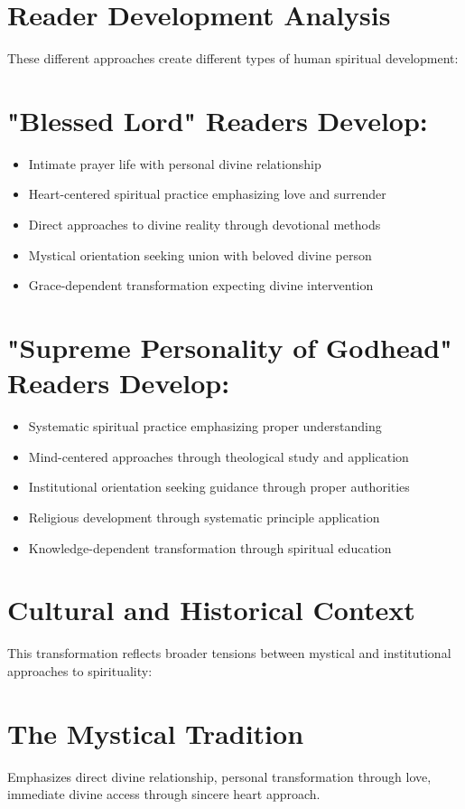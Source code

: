 \documentclass[11pt,twoside]{book}
\begin{document}
\section*{Reader Development Analysis}
\label{sec:orgb93ba68}

These different approaches create different types of human spiritual development:
\section*{"Blessed Lord" Readers Develop:}
\label{sec:org3e9b8cc}
\begin{itemize}
\item Intimate prayer life with personal divine relationship
\item Heart-centered spiritual practice emphasizing love and surrender
\item Direct approaches to divine reality through devotional methods
\item Mystical orientation seeking union with beloved divine person
\item Grace-dependent transformation expecting divine intervention
\end{itemize}
\section*{"Supreme Personality of Godhead" Readers Develop:}
\label{sec:orgc04162a}
\begin{itemize}
\item Systematic spiritual practice emphasizing proper understanding
\item Mind-centered approaches through theological study and application
\item Institutional orientation seeking guidance through proper authorities
\item Religious development through systematic principle application
\item Knowledge-dependent transformation through spiritual education
\end{itemize}
\section*{Cultural and Historical Context}
\label{sec:orga37fd8c}

This transformation reflects broader tensions between mystical and institutional approaches to spirituality:
\section*{The Mystical Tradition}
\label{sec:org9f82cdc}
Emphasizes direct divine relationship, personal transformation through love, immediate divine access through sincere heart approach.
\end{document}
